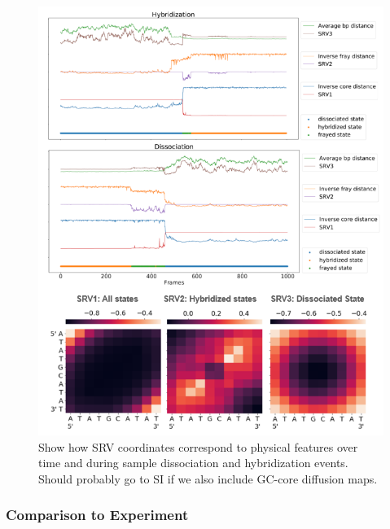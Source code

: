 \documentclass[journal=jpcbfk,manuscript=article]{achemso}
\begin{document}
\begin{figure} %
	\begin{center}
        \includegraphics[width=120mm]{Figs/figs_0804/GC-core_tracking_modes.png}
        \caption{Show how SRV coordinates correspond to physical features over time and during sample dissociation and hybridization events. Should probably go to SI if we also include GC-core diffusion maps.}
        \label{fig:GC-core_tracking_modes}
	\end{center}
\end{figure}    


\subsubsection{\label{sec:Results}Comparison to Experiment}
\end{document}
